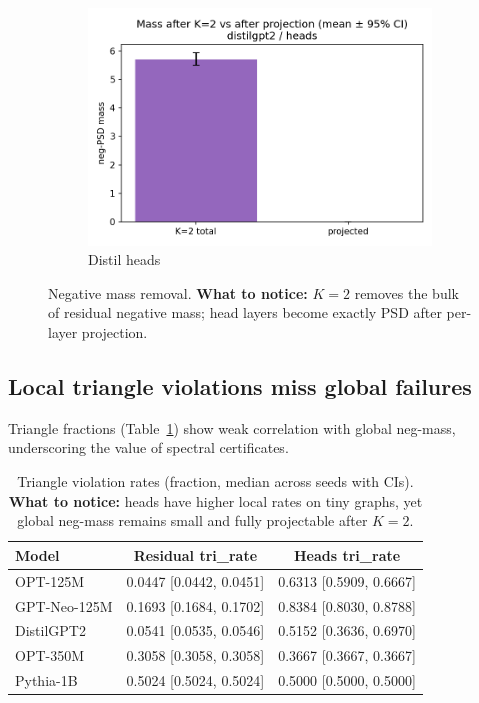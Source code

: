 \documentclass[11pt]{article}
\newcommand{\1}{\mathbf{1}}
\begin{document}
\begin{figure}[t]
\begin{subfigure}[t]{0.32\textwidth}
\includegraphics[width=\linewidth]{figs/mass_panel_distilgpt2_heads.png}
\caption{Distil heads}
\end{subfigure}
\caption{Negative mass removal. \textbf{What to notice:} $K{=}2$ removes the bulk of residual negative mass; head layers become exactly PSD after per-layer projection.}
\label{fig:masspanels}
\end{figure}

\subsection{Local triangle violations miss global failures}
Triangle fractions (Table~\ref{tab:tri}) show weak correlation with global neg-mass, underscoring the value of spectral certificates.

\begin{table}[h!]
\centering
\caption{Triangle violation rates (fraction, median across seeds with CIs). \textbf{What to notice:} heads have higher local rates on tiny graphs, yet global neg-mass remains small and fully projectable after $K{=}2$.}
\label{tab:tri}
\begin{tabular}{lcc}
\toprule
Model & Residual tri\_rate & Heads tri\_rate\\
\midrule
OPT-125M & 0.0447 [0.0442, 0.0451] & 0.6313 [0.5909, 0.6667]\\
GPT-Neo-125M & 0.1693 [0.1684, 0.1702] & 0.8384 [0.8030, 0.8788]\\
DistilGPT2 & 0.0541 [0.0535, 0.0546] & 0.5152 [0.3636, 0.6970]\\
OPT-350M & 0.3058 [0.3058, 0.3058] & 0.3667 [0.3667, 0.3667]\\
Pythia-1B & 0.5024 [0.5024, 0.5024] & 0.5000 [0.5000, 0.5000]\\
\bottomrule
\end{tabular}
\end{table}
\end{document}
